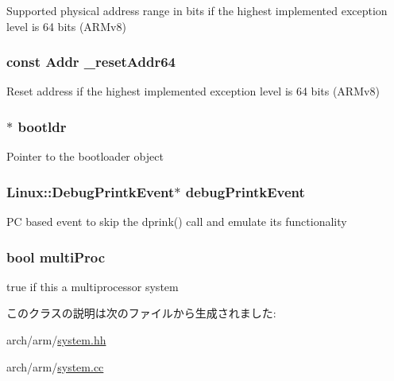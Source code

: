 \label{classArmSystem_aca8ae8dd2646e41f8b1e1db3bf8153e3}
Supported physical address range in bits if the highest implemented exception level is 64 bits (ARMv8) \hypertarget{classArmSystem_a44d32244f9a93e43785fd25bf729ec55}{
\subsubsection[{\_\-resetAddr64}]{\setlength{\rightskip}{0pt plus 5cm}const {\bf Addr} {\bf \_\-resetAddr64}}}
\label{classArmSystem_a44d32244f9a93e43785fd25bf729ec55}
Reset address if the highest implemented exception level is 64 bits (ARMv8) \hypertarget{classArmSystem_ac52aedcc0c513ce741fac3ea80c9b0d1}{
\subsubsection[{bootldr}]{$\ast$ {\bf bootldr}}}
\label{classArmSystem_ac52aedcc0c513ce741fac3ea80c9b0d1}
Pointer to the bootloader object \hypertarget{classArmSystem_aedceac66468548dd7c74a37cb968a83b}{
\subsubsection[{debugPrintkEvent}]{\setlength{\rightskip}{0pt plus 5cm}Linux::DebugPrintkEvent$\ast$ {\bf debugPrintkEvent}}}
\label{classArmSystem_aedceac66468548dd7c74a37cb968a83b}
PC based event to skip the dprink() call and emulate its functionality \hypertarget{classArmSystem_a872f015757d394b551ccf79cfb2c7979}{
\subsubsection[{multiProc}]{\setlength{\rightskip}{0pt plus 5cm}bool {\bf multiProc}}}
\label{classArmSystem_a872f015757d394b551ccf79cfb2c7979}
true if this a multiprocessor system 

このクラスの説明は次のファイルから生成されました:\begin{DoxyCompactItemize}
\item 
arch/arm/\hyperlink{arch_2arm_2system_8hh}{system.hh}\item 
arch/arm/\hyperlink{arch_2arm_2system_8cc}{system.cc}\end{DoxyCompactItemize}
